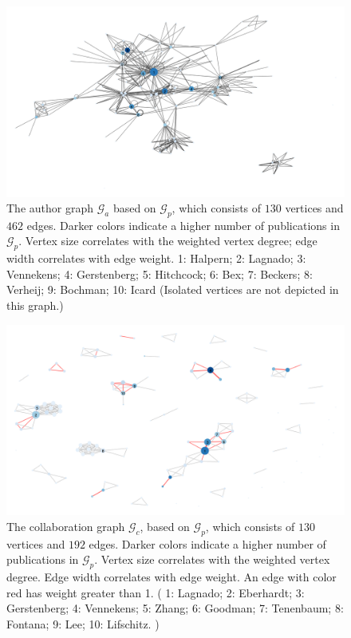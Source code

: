 \documentclass[11pt,a4paper]{book}
\theoremstyle{definition}
\theoremstyle{definition}
\theoremstyle{definition}
\theoremstyle{remark}
\newcommand{\pgraph}{\mathcal{G}_{p}}
\newcommand{\agraph}{\mathcal{G}_{a}}
\newcommand{\cgraph}{\mathcal{G}_{c}}
\begin{document}
\begin{figure}
\includegraphics[width=\textwidth]{author_graph.png}
\caption{The author graph  $\agraph$ based on $\pgraph$, which consists of  $130$ vertices and $462$ edges. 
Darker colors indicate a higher number of publications in $\pgraph$. Vertex size correlates with the weighted vertex degree; 
edge width correlates with edge weight.
1: Halpern;
2: Lagnado;
3: Vennekens;
4: Gerstenberg;
5: Hitchcock;
6: Bex;
7: Beckers;
8: Verheij;
9: Bochman;
10: Icard (Isolated vertices are not depicted in this graph.)}
\label{fig:agraph-actual_graph}
\end{figure}




\begin{figure}
\includegraphics[width=\textwidth]{collab_graph.png}
\caption{The collaboration graph  $\cgraph$, based on $\pgraph$, which consists of  $130$ vertices and $192$ edges. 
Darker colors indicate a higher number of publications in $\pgraph$. Vertex size correlates with the weighted vertex degree.
Edge width correlates with edge weight. An edge with color red has weight greater than 1. 
(
1: Lagnado;
2: Eberhardt;
3: Gerstenberg;
4: Vennekens;
5: Zhang;
6: Goodman;
7: Tenenbaum;
8: Fontana;
9: Lee;
10: Lifschitz.
)}
\label{fig:cgraph-actual_graph}
\end{figure}
\end{document}
